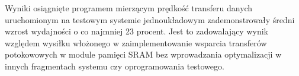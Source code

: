 Wyniki osiągnięte programem mierzącym prędkość transferu danych uruchomionym na testowym systemie jednoukładowym zademonstrowały średni wzrost wydajności o co najmniej 23 procent. Jest to zadowalający wynik względem wysiłku włożonego w zaimplementowanie wsparcia transferów potokowowych w module pamięci SRAM bez wprowadzania optymalizacji w innych fragmentach systemu czy oprogramowania testowego.
